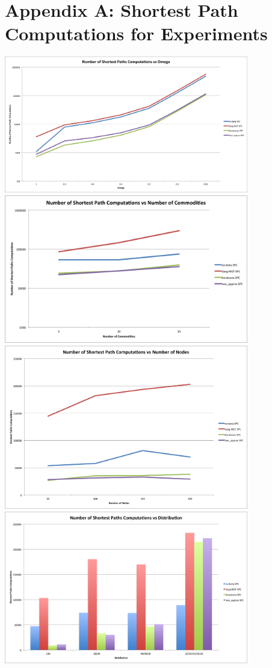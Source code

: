 \section*{Appendix A: Shortest Path Computations for Experiments}
\includegraphics[width=0.8\textwidth]{figures/omegas.png} \\
\includegraphics[width=0.8\textwidth]{figures/commodities.png}
\includegraphics[width=0.8\textwidth]{figures/nodes.png}
\includegraphics[width=0.8\textwidth]{figures/distribution.png}


